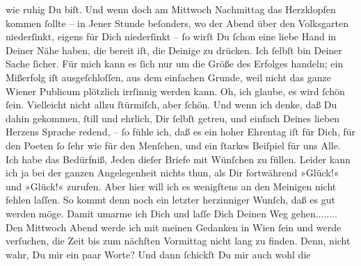 \begin{ledgroupsized}[t]{13cm}
               wie ruhig Du biſt. Und wenn doch am Mittwoch{ }Nachmittag das Herzklopfen kommen ſollte – in Jener Stunde beſonders, wo
               der Abend über den {\pb}\strikeout{\textcolor{gray}{×}\-\textcolor{gray}{×}\-\textcolor{gray}{×}\-\textcolor{gray}{×}\-\textcolor{gray}{×}\-\textcolor{gray}{×}\-\textcolor{gray}{×}}{ }Volksgarten niederſinkt, eigens für Dich
               niederſinkt – ſo wirſt Du ſchon eine liebe Hand in Deiner Nähe haben, die bereit iſt,
               die Deinige zu drücken. Ich ſelbſt bin Deiner Sache ſicher.  Für mich kann es ſich nur um die Größe des Erfolges handeln; ein Mißerfolg iſt
               ausgeſchloſſen,  aus dem einfachen Grunde, weil
               nicht das ganze Wiener Publicum plötzlich
               irrſinnig werden kann. Oh, ich glaube, es wird ſchön ſein. Vielleicht nicht allzu
               ſtürmiſch, aber ſchön. Und wenn ich denke, {\pb}daß Du
               dahin gekommen, ſtill und ehrlich, Dir  ſelbſt
               getreu, und einfach Deines lieben Herzens Sprache redend, – ſo fühle ich, daß es ein
               hoher Ehrentag iſt für Dich, für den Poeten ſo ſehr
               wie für den Menſchen, und ein ſtarkes Beiſpiel für uns Alle. Ich habe das Bedürfniß,
               Jeden dieſer Briefe mit Wünſchen zu füllen. Leider kann ich ja bei der ganzen
               Angelegenheit nichts thun, als Dir fortwährend »Glück!« und »Glück!« zurufen. Aber
               hier will ich es wenigſtens an den Meinigen nicht {\pb}fehlen laſſen. So kommt denn noch ein letzter herzinniger Wunſch, daß es gut werden
               möge. Damit umarme ich Dich und laſſe Dich Deinen Weg gehen........\pend
           \pstart
           Den Mittwoch{ }Abend werde ich mit meinen Gedanken in Wien ſein und werde verſuchen, die Zeit bis zum nächſten
                  Vormittag nicht lang zu finden. Denn, nicht wahr, Du \label{K_L02750-2v}\label{K_L02750-2h} mir ein paar Worte? Und dann ſchickſt Du mir auch wohl die

\end{ledgroupsized}
